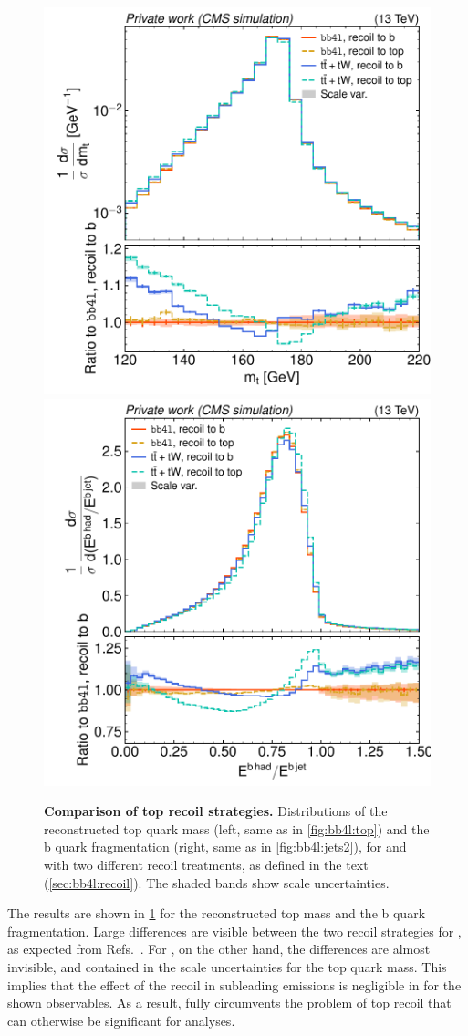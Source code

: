 \begin{figure}[tp]
    \centering
    \includegraphics[width=0.49 \textwidth]{figures/bb4l/recoil/MC_TTBAR_DILEP_SPINDENSITY_anytop_mass.pdf}
    \hfill
    \includegraphics[width=0.49 \textwidth]{figures/bb4l/recoil/MC_HFJETS_efracB.pdf}
    \caption{\textbf{Comparison of top recoil strategies.} Distributions of the reconstructed top quark mass (left, same as in \cref{fig:bb4l:top}) and the b quark fragmentation (right, same as in \cref{fig:bb4l:jets2}), for \bbfourl and \tttWsum with two different recoil treatments, as defined in the text (\cref{sec:bb4l:recoil}). The shaded bands show scale uncertainties.}
    \label{fig:bb4l:recoil}
\end{figure}

The results are shown in \cref{fig:bb4l:recoil} for the reconstructed top mass and the b quark fragmentation. Large differences are visible between the two recoil strategies for \tttWsum, as expected from Refs.~\cite{Brooks:2019xso,ATLAS:2022jbw}. For \bbfourl, on the other hand, the differences are almost invisible, and contained in the scale uncertainties for the top quark mass. This implies that the effect of the recoil in subleading emissions is negligible in \bbfourl for the shown observables. As a result, \bbfourl fully circumvents the problem of top recoil that can otherwise be significant for \ttbar analyses.

